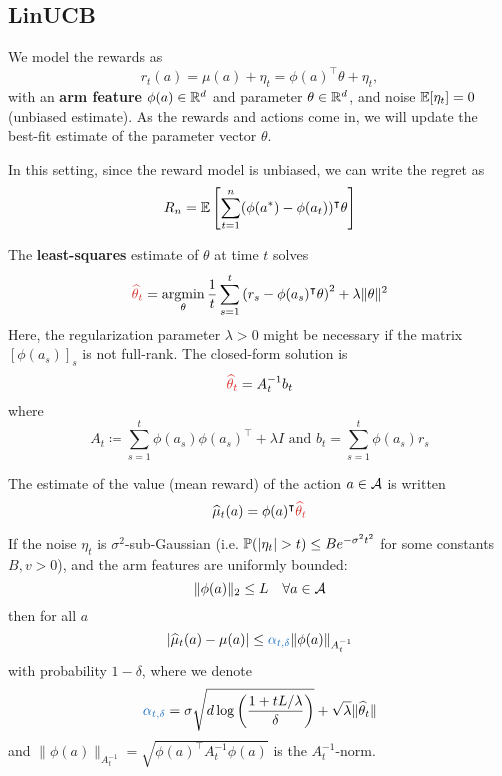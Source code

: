 \documentclass[../course-notes.tex]{subfiles}
\begin{document}
\subsection{LinUCB}


We model the rewards as
\[
	r_t(a) = \mu(a) + \eta_t = \phi(a)^\intercal \theta + \eta_t,
\]
with an \textbf{arm feature} $\phi(a) \in \mathbb{R}^d$ and parameter $\theta\in\mathbb{R}^d$, and noise $\operatorname{\mathbb{E}}[\eta_t] = 0$ (unbiased estimate). As the rewards and actions come in, we will update the best-fit estimate of the parameter vector $\theta$.

\begin{remark}
In this setting, since the reward model is unbiased, we can write the regret as
\begin{equation}
	R_n = \operatorname{\mathbb{E}}\left[
	\sum_{t=1}^n (\phi(a^*)-\phi(a_t))^\intercal \theta
	\right]
\end{equation}
\end{remark}

The \textbf{least-squares} estimate of $\theta$ at time $t$ solves
\begin{equation}\label{eq:LinUCBleastSq}
	{\redfont \widehat{\theta}_t} =
	\argmin_\theta \frac{1}{t} \sum_{s=1}^t \left(r_s - \phi(a_s)^\intercal\theta\right)^2 + \lambda \|\theta\|^2
\end{equation}
Here, the regularization parameter $\lambda > 0$ might be necessary if the matrix $[\phi(a_s)]_s$ is not full-rank. The closed-form solution is
\begin{equation}
	{\redfont\widehat{\theta}_t} = A_t^{-1} b_t
\end{equation}
where
\[
	A_t \coloneqq \sum_{s=1}^t \phi(a_s)\phi(a_s)^\intercal + \lambda I  \text{ and }
	b_t = \sum_{s=1}^t \phi(a_s) r_s
\]

The estimate of the value (mean reward) of the action $a\in\mathcal{A}$ is written
\begin{equation}
	\widehat{\mu}_t(a) = \phi(a)^\intercal {\redfont \widehat{\theta}_t}
\end{equation}

\begin{prop}
	If the noise $\eta_t$ is $\sigma^2$-sub-Gaussian (i.e. $\mathbb{P}(|\eta_t| > t) \leq Be^{-\sigma^2t^2}$ for some constants $B,v>0$), and the arm features are uniformly bounded:
	\[
		\|\phi(a)\|_2 \leq L\quad \forall a\in\mathcal{A}
	\]
	then for all $a$
	\[
		\left|\widehat{\mu}_t(a) - \mu(a) \right|
		\leq {\bluefont\alpha_{t,\delta}} \| \phi(a) \|_{A_t^{-1}}
	\]
	with probability $1-\delta$, where we denote
	\begin{equation}\label{eq:LinUCBalpha}
		{\bluefont\alpha_{t,\delta}} = \sigma \sqrt{d \log\left(\frac{1+tL/\lambda}{\delta}\right)} + \sqrt{\lambda}\|\widehat{\theta}_t\|
	\end{equation}
	and $\|\phi(a)\|_{A_t^{-1}} = \sqrt{\phi(a)^\intercal A_t^{-1}\phi(a)}$ is the $A_t^{-1}$-norm.
\end{prop}
\end{document}
